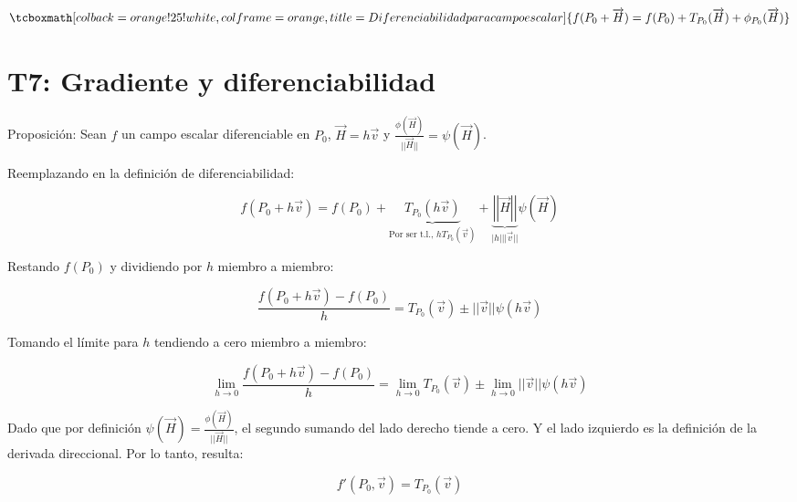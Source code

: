 \documentclass{article}
\begin{document}
\begin{equation}
\tcboxmath[colback=orange!25!white,colframe=orange, title=Diferenciabilidad para campo escalar]
{ f(P_0 + \overrightarrow{H}) = f(P_0) + T_{P_0}(\overrightarrow{H}) + \phi_{P_0}(\overrightarrow{H}) }
\end{equation}

\section{T7: Gradiente y diferenciabilidad}

Proposición: Sean $f$ un campo escalar diferenciable en $P_0$, $\overrightarrow{H} = h \overrightarrow{v}$ y $\frac{\phi(\overrightarrow{H})}{||\overrightarrow{H}||} = \psi(\overrightarrow{H})$.

Reemplazando en la definición de diferenciabilidad:

\begin{equation}
f(P_0 + h \overrightarrow{v}) = f(P_0) + \underbrace{ T_{P_0}(h \overrightarrow{v}) }_{\text{Por ser t.l., } h T_{P_0}(\overrightarrow{v})} + \underbrace{ \left|\left|\overrightarrow{H}\right|\right| }_{|h| ||\overrightarrow{v}||} \psi(\overrightarrow{H})
\end{equation}

Restando $f(P_0)$ y dividiendo por $h$ miembro a miembro:

\begin{equation}
\frac{f(P_0 + h\overrightarrow{v})-f(P_0)}{h} = T_{P_0}(\overrightarrow{v}) \pm ||\overrightarrow{v}|| \psi(h \overrightarrow{v})
\end{equation}

Tomando el límite para $h$ tendiendo a cero miembro a miembro:

\begin{equation}
\lim_{h \rightarrow 0} \frac{f(P_0 + h\overrightarrow{v})-f(P_0)}{h} = \lim_{h \rightarrow 0} T_{P_0}(\overrightarrow{v}) \pm \lim_{h \rightarrow 0} ||\overrightarrow{v}|| \psi(h \overrightarrow{v}) 
\end{equation}

Dado que por definición $\psi(\overrightarrow{H}) = \frac{\phi(\overrightarrow{H})}{||\overrightarrow{H}||}$, el segundo sumando del lado derecho tiende a cero. Y el lado izquierdo es la definición de la derivada direccional. Por lo tanto, resulta:

\begin{equation}
f'(P_0, \overrightarrow{v}) = T_{P_0}(\overrightarrow{v})
\end{equation}
\end{document}
